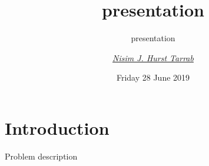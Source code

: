 \documentclass[10pt,ignorenonframetext,]{beamer}
\title[presentation]{presentation}
\subtitle{presentation}
\author[Nisim Hurst]{\href{mailto:langheran@gmail.com}{\emph{Nisim J. Hurst Tarrab}}}
\date{Friday 28 June 2019}
\begin{document}
\frame{\titlepage}

\hypertarget{introduction}{%
\section{Introduction}\label{introduction}}

\begin{frame}{Problem description}
\protect\hypertarget{problem-description}{}

\begincols
{}
\endcol
{}
\endcol
\endcols

\end{frame}

\section[Contents]{}
\end{document}

